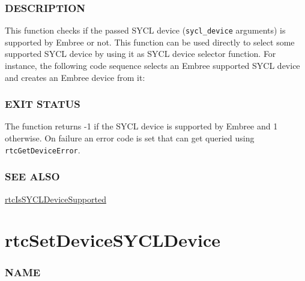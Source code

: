 \subsubsection{DESCRIPTION}\label{description}

This function checks if the passed SYCL device (\texttt{sycl\_device}
arguments) is supported by Embree or not. This function can be used
directly to select some supported SYCL device by using it as SYCL device
selector function. For instance, the following code sequence selects an
Embree supported SYCL device and creates an Embree device from it:

\begin{Shaded}
\begin{Highlighting}[]
\OperatorTok{::}\OperatorTok{(}\OperatorTok{);}
\OperatorTok{::}\OperatorTok{(}\OperatorTok{);}
\OperatorTok{::}\OperatorTok{(}\OperatorTok{);}
\OperatorTok{=}\OperatorTok{(}\OperatorTok{,}\OperatorTok{);}
\end{Highlighting}
\end{Shaded}

\subsubsection{EXIT STATUS}\label{exit-status}

The function returns -1 if the SYCL device is supported by Embree and 1
otherwise. On failure an error code is set that can get queried using
\texttt{rtcGetDeviceError}.

\subsubsection{SEE ALSO}\label{see-also}

\hyperref[rtcissycldevicesupported]{rtcIsSYCLDeviceSupported}

\pagebreak

\section{rtcSetDeviceSYCLDevice}\label{rtcsetdevicesycldevice}

\subsubsection{NAME}\label{name}

